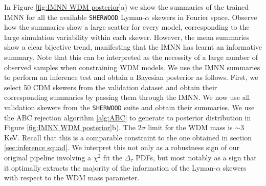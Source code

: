 In Figure \ref{fig:IMNN WDM posterior}a) we show the summaries of the trained IMNN for all the available \texttt{SHERWOOD} Lyman-$\alpha$ skewers in Fourier space. Observe how the summaries show a large scatter for every model, corresponding to the large simulation variability within each skewer. However, the mean summaries show a clear bijective trend, manifesting that the IMNN has learnt an informative summary. Note that this can be interpreted as the necessity of a large number of observed samples when constraining WDM models.
We use the IMNN summaries to perform an inference test and obtain a Bayesian posterior as follows. First, we select 50 CDM skewers from the validation dataset and obtain their corresponding summaries by passing them through the IMNN. We now use all validation skewers from the \texttt{SHERWOOD} suite and obtain their summaries. We use the ABC rejection algorithm \ref{alg:ABC} to generate to posterior distribution in Figure \ref{fig:IMNN WDM posterior}b). The $2\sigma$ limit for the WDM mass is $\sim 3$ KeV. Recall that this is a comparable constraint to the one obtained in section \ref{sec:inference squad}. We interpret this not only as a robustness sign of our original pipeline involving a $\chi^2$ fit the $\Delta_\tau$ PDFs, but most notably as a sign that it optimally extracts the majority of the information of the Lyman-$\alpha$ skewers with respect to the WDM mass parameter.

























